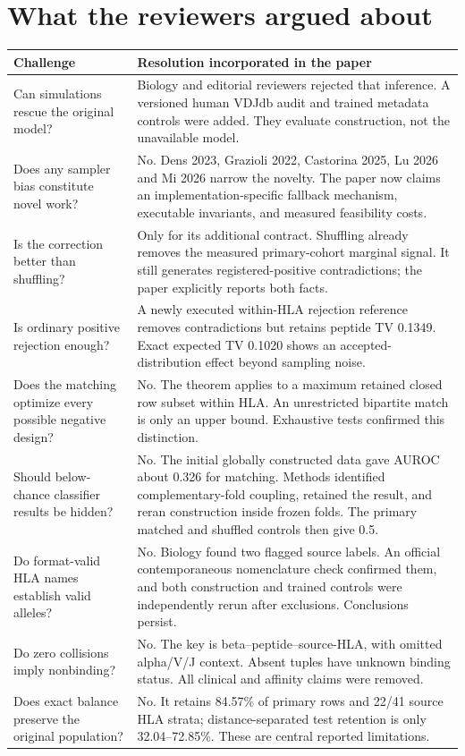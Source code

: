 \documentclass[11pt,a4paper]{article}
\begin{document}
\section{What the reviewers argued about}
\begin{longtable}{p{}p{}}
\toprule
Challenge & Resolution incorporated in the paper\\\midrule
\endhead
Can simulations rescue the original model? & Biology and editorial reviewers rejected that inference. A versioned human VDJdb audit and trained metadata controls were added. They evaluate construction, not the unavailable model.\\
Does any sampler bias constitute novel work? & No. Dens 2023, Grazioli 2022, Castorina 2025, Lu 2026 and Mi 2026 narrow the novelty. The paper now claims an implementation-specific fallback mechanism, executable invariants, and measured feasibility costs.\\
Is the correction better than shuffling? & Only for its additional contract. Shuffling already removes the measured primary-cohort marginal signal. It still generates registered-positive contradictions; the paper explicitly reports both facts.\\
Is ordinary positive rejection enough? & A newly executed within-HLA rejection reference removes contradictions but retains peptide TV 0.1349. Exact expected TV 0.1020 shows an accepted-distribution effect beyond sampling noise.\\
Does the matching optimize every possible negative design? & No. The theorem applies to a maximum retained closed row subset within HLA. An unrestricted bipartite match is only an upper bound. Exhaustive tests confirmed this distinction.\\
Should below-chance classifier results be hidden? & No. The initial globally constructed data gave AUROC about 0.326 for matching. Methods identified complementary-fold coupling, retained the result, and reran construction inside frozen folds. The primary matched and shuffled controls then give 0.5.\\
Do format-valid HLA names establish valid alleles? & No. Biology found two flagged source labels. An official contemporaneous nomenclature check confirmed them, and both construction and trained controls were independently rerun after exclusions. Conclusions persist.\\
Do zero collisions imply nonbinding? & No. The key is beta--peptide--source-HLA, with omitted alpha/V/J context. Absent tuples have unknown binding status. All clinical and affinity claims were removed.\\
Does exact balance preserve the original population? & No. It retains 84.57\% of primary rows and 22/41 source HLA strata; distance-separated test retention is only 32.04--72.85\%. These are central reported limitations.\\
\bottomrule
\end{longtable}
\end{document}
